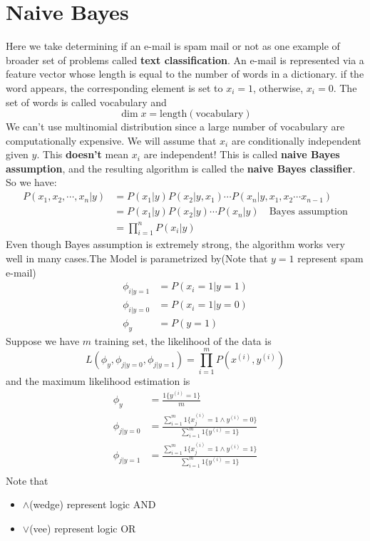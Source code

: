\documentclass[10pt,a4paper,oneside]{article}
\begin{document}
\section{Naive Bayes}
Here we take determining if an e-mail is spam mail or not as one example of broader set of problems called \textbf{text classification}. An e-mail is represented via a feature vector whose length is equal to the number of words in a dictionary. if the word appears, the corresponding element is set to $x_i = 1$, otherwise, $x_i = 0$. The set of words is called vocabulary and 
\[
\dim x = \text{length}(\text{vocabulary})
\]
We can't use multinomial distribution since a large number of vocabulary are computationally expensive. We will assume that $x_i$ are conditionally independent given $y$. This \textbf{doesn't} mean $x_i$ are independent! This is called \textbf{naive Bayes assumption}, and the resulting algorithm is called the \textbf{naive Bayes classifier}. So we have:
\begin{align*}
P(x_1, x_2,\cdots, x_n|y) &= P(x_1|y)P(x_2|y,x_1)\cdots P(x_n|y,x_1,x_2\cdots x_{n-1})\\
&=P(x_1|y)P(x_2|y)\cdots P(x_n|y) \quad \text{Bayes assumption}\\
&= \prod_{i=1}^{n}P(x_i|y)
\end{align*}
Even though Bayes assumption is extremely strong, the algorithm works very well in many cases.The Model is parametrized by(Note that $y=1$ represent spam e-mail)
\begin{align*}
\phi_{i|y=1} &= P(x_i=1| y=1)\\
\phi_{i|y=0} &= P(x_i=1| y=0)\\
\phi_y &= P(y=1)
\end{align*} 
Suppose we have $m$ training set, the likelihood of the data is
\[
L(\phi_y, \phi_{j|y=0}, \phi_{j|y=1}) = \prod_{i=1}^{m} P(x^{(i)}, y^{(i)})
\]
and the maximum likelihood estimation is
\begin{align*}
\phi_y &= \frac{1\{y^{(i)} =1\}}{m}\\
\phi_{j|y=0}&=\frac{\sum_{i=1}^{m} 1\{x_j ^{(i)} =1 \wedge y^{(i)}=0 \}}{\sum_{i=1}^{m} 1\{y^{(i)} =1\}}\\
\phi_{j|y=1}&=\frac{\sum_{i=1}^{m} 1\{x_j ^{(i)} =1 \wedge y^{(i)}=1 \}}{\sum_{i=1}^{m} 1\{y^{(i)} =1\}}\\
\end{align*}
Note that
\begin{itemize}
	\item $\wedge$(wedge) represent logic AND
	\item $\vee$(vee) represent logic OR
\end{itemize}
\end{document}
